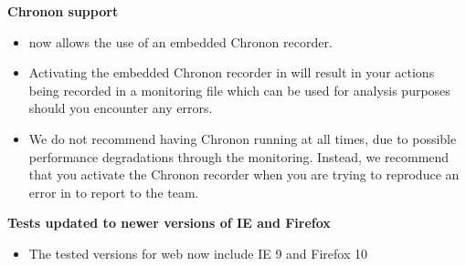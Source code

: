 \textbf{Chronon support}
\begin{itemize}
\item \app{} now allows the use of an embedded Chronon recorder. 
\item Activating the embedded Chronon recorder in \app{} will result in your actions being recorded in a monitoring file which can be used for analysis purposes should you encounter any errors.
\item We do not recommend having Chronon running at all times, due to possible performance degradations through the monitoring. Instead, we recommend that you activate the Chronon recorder when you are trying to reproduce an error in \app{} to report to the team.
\end{itemize}

\textbf{Tests updated to newer versions of IE and Firefox}
\begin{itemize}
\item The tested versions for web \gdauts{} now include IE 9 and Firefox 10
\end{itemize}
